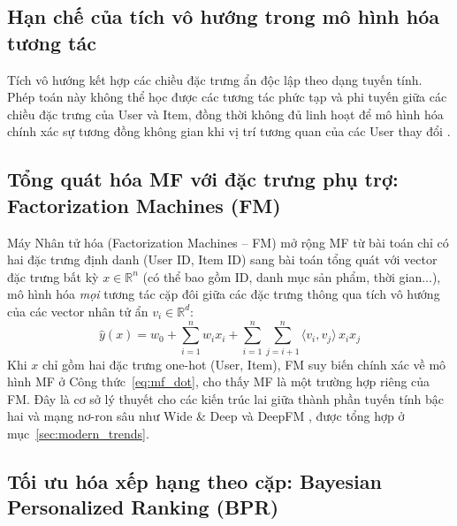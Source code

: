 \subsection{Hạn chế của tích vô hướng trong mô hình hóa tương tác}
\label{subsec:mf_limitations}

Tích vô hướng kết hợp các chiều đặc trưng ẩn độc lập theo dạng tuyến tính. Phép toán này không thể học được các tương tác phức tạp và phi tuyến giữa các chiều đặc trưng của User và Item, đồng thời không đủ linh hoạt để mô hình hóa chính xác sự tương đồng không gian khi vị trí tương quan của các User thay đổi \parencite{he2017ncf}.

\subsection{Tổng quát hóa MF với đặc trưng phụ trợ: Factorization Machines (FM)}
\label{subsec:fm}

Máy Nhân tử hóa (Factorization Machines -- FM) \parencite{rendle2010fm} mở rộng MF từ bài toán chỉ có hai đặc trưng định danh (User ID, Item ID) sang bài toán tổng quát với vector đặc trưng bất kỳ $x \in \mathbb{R}^n$ (có thể bao gồm ID, danh mục sản phẩm, thời gian...), mô hình hóa \emph{mọi} tương tác cặp đôi giữa các đặc trưng thông qua tích vô hướng của các vector nhân tử ẩn $v_i \in \mathbb{R}^d$:
\begin{equation}
    \hat{y}(x) = w_0 + \sum_{i=1}^{n} w_i x_i + \sum_{i=1}^{n} \sum_{j=i+1}^{n} \langle v_i, v_j \rangle \, x_i x_j
    \label{eq:fm}
\end{equation}
Khi $x$ chỉ gồm hai đặc trưng one-hot (User, Item), FM suy biến chính xác về mô hình MF ở Công thức~\eqref{eq:mf_dot}, cho thấy MF là một trường hợp riêng của FM. Đây là cơ sở lý thuyết cho các kiến trúc lai giữa thành phần tuyến tính bậc hai và mạng nơ-ron sâu như Wide \& Deep \parencite{cheng2016wide} và DeepFM \parencite{guo2017deepfm}, được tổng hợp ở mục~\ref{sec:modern_trends}.

\subsection{Tối ưu hóa xếp hạng theo cặp: Bayesian Personalized Ranking (BPR)}
\label{subsec:bpr}

